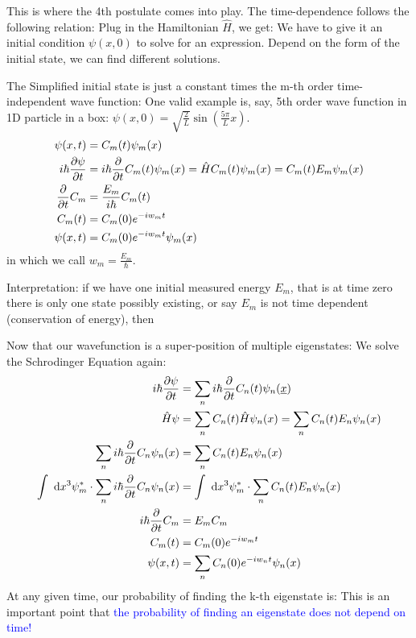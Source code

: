 \documentclass{school-22.101-notes}
\date{October 3, 2011}
\begin{document}
\maketitle

This is where the 4th postulate comes into play. The time-dependence follows the following relation:
Plug in the Hamiltonian $\hat{H}$, we get: 
We have to give it an initial condition $\psi(x,0)$ to solve for an expression. Depend on the form of the initial state, we can find different solutions. 

The Simplified initial state is just a constant times the m-th order time-independent wave function:
One valid example is, say, 5th order wave function in 1D particle in a box: $\psi(x,0) = \sqrt{\frac{2}{L}} \sin \left( \frac{5 \pi}{L} x\right).$
\begin{align}
\psi(x,t) &= C_m(t) \psi_m(x) \\
i \hbar \frac{\partial \psi}{\partial t} &= i \hbar \frac{\partial}{\partial t} C_m (t) \psi_m (x) = \hat{H} C_m (t) \psi_m (x) = C_m (t) E_m \psi_m (x) \\
\frac{\partial}{\partial t} C_m &= \frac{E_m}{i\hbar} C_m (t) \\
C_m (t) &= C_m(0) e^{-i w_m t} \\
\psi(x,t) &= C_m(0) e^{-i w_m t} \psi_m (x) 
\end{align}
in which we call $w_m = \frac{E_m}{\hbar}$. 

Interpretation: if we have one initial measured energy $E_m$, that is at time zero there is only one state possibly existing, or say $E_m$ is not time dependent (conservation of energy), then 


Now that our wavefunction is a super-position of multiple eigenstates:
We solve the Schrodinger Equation again:
\begin{align}
i \hbar \frac{\partial \psi}{\partial t} &= \displaystyle\sum_n i \hbar \frac{\partial}{\partial t} C_n (t) \psi_n (\underline{x}) \\
\hat{H} \psi &= \displaystyle\sum_n C_n (t) \hat{H} \psi_n (x) = \displaystyle\sum_n C_n (t) E_n \psi_n (x) \\
\displaystyle\sum_n i \hbar \frac{\partial}{\partial t} C_n \psi_n (x) &= \displaystyle\sum_n C_n(t) E_n \psi_n(x) \\
\int \mbox{ }\mathrm{d} x^3 \psi_m^* \cdot \displaystyle\sum_n i \hbar \frac{\partial}{\partial t} C_n \psi_n (x) &= \int \mbox{ }\mathrm{d} x^3 \psi_m^* \cdot\displaystyle\sum_n C_n(t) E_n \psi_n(x) \\
i \hbar \frac{\partial}{\partial t} C_m &= E_m C_m \\
C_m (t) &= C_m (0) e^{-iw_m t} \\
\psi(x,t) &= \displaystyle\sum_n C_n (0) e^{-i w_n t} \psi_n (x) 
\end{align}
At any given time, our probability of finding the k-th eigenstate is:
This is an important point that \textcolor{blue}{the probability of finding an eigenstate does not depend on time!}
\end{document}
